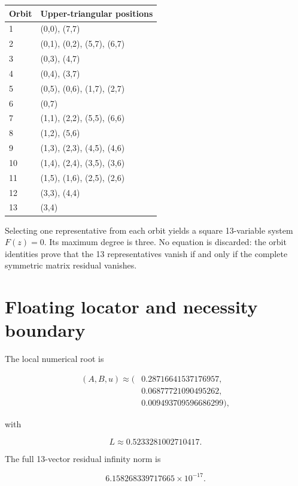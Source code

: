 \documentclass[11pt,a4paper,openany]{report}
\begin{document}
\begin{center}
\begingroup\small
\setlength{\tabcolsep}{2.5pt}
\renewcommand{\arraystretch}{1.16}
\begin{longtable}{@{}p{}p{}@{}}
\toprule
\textbf{Orbit} & \textbf{Upper-triangular positions} \\
\midrule
\endhead
1 & (0,0), (7,7) \\
2 & (0,1), (0,2), (5,7), (6,7) \\
3 & (0,3), (4,7) \\
4 & (0,4), (3,7) \\
5 & (0,5), (0,6), (1,7), (2,7) \\
6 & (0,7) \\
7 & (1,1), (2,2), (5,5), (6,6) \\
8 & (1,2), (5,6) \\
9 & (1,3), (2,3), (4,5), (4,6) \\
10 & (1,4), (2,4), (3,5), (3,6) \\
11 & (1,5), (1,6), (2,5), (2,6) \\
12 & (3,3), (4,4) \\
13 & (3,4) \\
\bottomrule
\end{longtable}
\endgroup
\end{center}

Selecting one representative from each orbit yields a square 13-variable system \(F(z)=0\). Its maximum degree is three. No equation is discarded: the orbit identities prove that the 13 representatives vanish if and only if the complete symmetric matrix residual vanishes.

\section{Floating locator and necessity boundary}

The local numerical root is

\[
\begin{aligned}
(A,B,u)\approx(&0.28716641537176957,\\
&0.06877721090495262,\\
&0.009493709596686299),
\end{aligned}
\]

with

\[
L\approx0.5233281002710417.
\]

The full 13-vector residual infinity norm is

\[
6.158268339717665\times10^{-17}.
\]
\end{document}
